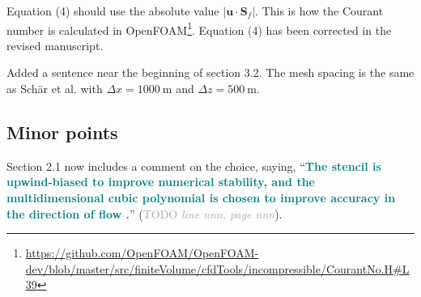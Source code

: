 \documentclass[times]{elsarticle}
\newcommand{\TODO}[1]{\textcolor{darkgray}{TODO \textit{#1}}}
\newcommand{\revtwo}[1]{\textcolor{teal}{\textbf{#1}}}
\begin{document}
\begin{quotation}
\begin{comment}
\item The Courant number as defined by (4) would appear to vanish for a non-divergent
flow. A more natural definition might be to sum only over outflow faces (and
remove the factor $1/2$). For non-divergent flow that would be equivalent to
replacing $\mathbf{u} \cdot \mathbf{S}_f$ by $| \mathbf{u} \cdot \mathbf{S}_f |$
in~(4).
\end{comment}
\end{quotation}
Equation (4) should use the absolute value $\lvert \mathbf{u} \cdot \mathbf{S}_f \rvert$.  This is how the Courant number is calculated in OpenFOAM\footnote{\url{https://github.com/OpenFOAM/OpenFOAM-dev/blob/master/src/finiteVolume/cfdTools/incompressible/CourantNo.H\#L39}}.  Equation (4) has been corrected in the revised manuscript.

\begin{quotation}
\begin{comment}
\item Section 3.2 and Table~1: what resolution is used?
\end{comment}
\end{quotation}
Added a sentence near the beginning of section 3.2.  The mesh spacing is the same as Sch\"ar et al. \citep{schaer2002} with $\Delta x = \SI{1000}{\meter}$ and $\Delta z = \SI{500}{\meter}$.

\subsection*{Minor points}

\begin{quotation}
\begin{comment}
\item It would be interesting to know if there was some rationale for the choice of
the polynomial (5) and the stencil discussed in  section 2.1.1. Given that the scheme
is second order convergent, might it be possible to use a lower degree polynomial
and smaller stencil?
\end{comment}
\end{quotation}
Section 2.1 now includes a comment on the choice, saying, ``\revtwo{The stencil is upwind-biased to improve numerical stability, and the multidimensional cubic polynomial is chosen to improve accuracy in the direction of flow \citep{leonard1993}.}'' (\TODO{line nnn, page nnn}).
\end{document}
